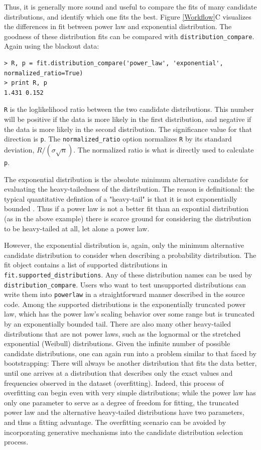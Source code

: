 \documentclass[10pt]{article}
\begin{document}
Thus, it is generally more sound and useful to compare the fits of many candidate distributions, and identify which one fits the best. Figure \ref{Workflow}C visualizes the differences in fit between power law and exponential distribution. The goodness of these distribution fits can be compared with  \verb$distribution_compare$. Again using the blackout data:

\begin{verbatim}
> R, p = fit.distribution_compare('power_law', 'exponential', normalized_ratio=True)
> print R, p
1.431 0.152
\end{verbatim}

\verb$R$ is the loglikelihood ratio between the two candidate distributions. This number will be positive if the data is more likely in the first distribution, and negative if the data is more likely in the second distribution. The significance value for that direction is \verb$p$. The \verb$normalized_ratio$ option normalizes \verb$R$ by its standard deviation, $R/(\sigma \sqrt{n})$. The normalized ratio is what is directly used to calculate \verb$p$.

The exponential distribution is the absolute minimum alternative candidate for evaluating the heavy-tailedness of the distribution. The reason is definitional: the typical quantitative defintion of a "heavy-tail" is that it is not exponentially bounded \cite{Asmussen2003}. Thus if a power law is not a better fit than an expontial distribution (as in the above example) there is scarce ground for considering the distribution to be heavy-tailed at all, let alone a power law. 

However, the exponential distribution is, again, only the minimum alternative candidate distribution to consider when describing a probability distribution. The fit object contains a list of supported distributions in \verb$fit.supported_distributions$. Any of these distribution names can be used by \verb$distribution_compare$. Users who want to test unsupported distributions can write them into \verb$powerlaw$ in a straightforward manner described in the source code. Among the supported distributions is the exponentially truncated power law, which has the power law's scaling behavior over some range but is truncated by an exponentially bounded tail. There are also many other heavy-tailed distributions that are not power laws, such as the lognormal or the stretched exponential (Weibull) distributions. Given the infinite number of possible candidate distributions, one can again run into a problem similar to that faced by bootstrapping: There will always be another distribution that fits the data better, until one arrives at a distribution that describes only the exact values and frequencies observed in the dataset (overfitting). Indeed, this process of overfitting can begin even with very simple distributions; while the power law has only one parameter to serve as a degree of freedom for fitting, the truncated power law and the alternative heavy-tailed distributions have two parameters, and thus a fitting advantage.  The overfitting scenario can be avoided by incorporating generative mechanisms into the candidate distribution selection process.
\end{document}
